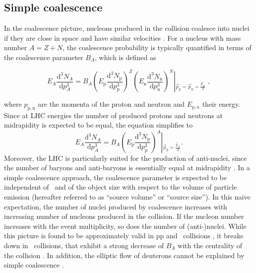 \documentclass[a4paper,11pt]{scrartcl} %
\begin{document}
\subsection{Simple coalescence}
In the coalescence picture, nucleons produced in the collision coalesce into nuclei if they are close in space and have similar velocities \cite{Butler:1963,Kapusta:1980}. For a nucleus with mass number $A = Z + N$, the coalescence probability is typically quantified in terms of the coalescence parameter $B_{A}$, which is defined as

\begin{equation}
E_{A}\frac{\mathrm{d}^{3}N_{A}}{\mathrm{d}p_{A}^{3}}=B_{A}{\left(E_{\mathrm{p}}\frac{\mathrm{d}^{3}N_{\mathrm{p}}}{\mathrm{d}p_{\mathrm{p}}^{3}}\right)^{Z}\left(E_{\mathrm{n}}\frac{\mathrm{d}^{3}N_{\mathrm{n}}}{\mathrm{d}p_{\mathrm{n}}^{3}}\right)^{N}}\left\vert_{\vec{p}_{\mathrm{p}}=\vec{p}_{\mathrm{n}}=\frac{\vec{p}_{A}}{A}} \right.\;,    
\label{eq:BA}
\end{equation}

\noindent where $p_{\mathrm{p,n}}$ are the momenta of the proton and neutron and $E_{p,n}$ their energy.
Since at LHC energies the number of produced protons and neutrons at midrapidity is expected to be equal, the equation simplifies to 
\begin{equation}
E_{A}\frac{\mathrm{d}^{3}N_{A}}{\mathrm{d}p_{A}^{3}}=B_{A}{\left(E_{\mathrm{p}}\frac{\mathrm{d}^{3}N_{\mathrm{p}}}{\mathrm{d}p_{\mathrm{p}}^{3}}\right)^{A}}\left\vert_{\vec{p}_{\mathrm{p}}=\frac{\vec{p}_{A}}{A}} \right..
\label{eq:BA}
\end{equation}
%
Moreover, the LHC is particularly suited for the production of anti-nuclei, since the number of baryons and anti-baryons is essentially equal at midrapidity \cite{Abbas:2013rua}.
In a simple coalescence approach, the coalescence parameter is expected to be independent of \pt~and of the object size with respect to the volume of particle emission (hereafter referred to as ``source volume'' or ``source size'').
In this naive expectation, the number of nuclei produced by coalescence increases with increasing number of nucleons produced in the collision. If the nucleon number increases with the event multiplicity, so does the number of (anti-)nuclei. 
While this picture is found to be approximately valid in pp and \pPb~collisions \cite{ALICE:nucleipp2017, ALICE:nucleipPb2018}, it breaks down in \PbPb~collisions, that exhibit a strong decrease of $B_{A}$ with the centrality of the collision \cite{ALICE:deuteronppPbPb2015}. 
In addition, the elliptic flow of deuterons cannot be explained by simple coalescence \cite{ALICE:deuteronflow2017}. 
\end{document}

